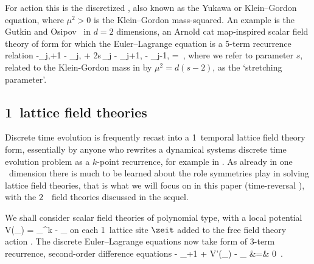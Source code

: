 For action  this is the discretized
{\sPe}, also known as the {Yukawa} or Klein–Gordon
equation, where  ${\mu}^2>0$ is the Klein–\-Gordon mass-squared.
An example is the Gutkin and Osipov \catlatt\ in  $d=2$
dimensions, an Arnold cat map-inspired scalar field theory  of
form  for which the Euler–\-Lagrange
equation  is a 5-term recurrence relation
\beq
      -\ssp_{j,\zeit+1} - \ssp_{j,}
+ 2{s}\,\ssp_{j\zeit}
     - \ssp_{j+1,\zeit} - \ssp_{j-1, \zeit}
     =  
\,,
where we refer to parameter ${s}$, related to the Klein-Gordon mass in
 by ${\mu}^2=d({s}-2)$, as the `stretching
parameter'.

\subsection{1\dmn\ lattice field theories}
\label{s:LC21FT1d}

Discrete time evolution is frequently recast into a 1\dmn\ temporal
lattice field theory form, essentially by anyone who rewrites a
dynamical systems discrete time evolution problem as a $k$-point recurrence,
for example in
.
As already in one \spt\ dimension there is much to be learned about the
role symmetries play in solving lattice field theories, that is what we
will focus on in this paper (time-reversal
), with the $2$\dmn\ \spt\ field
theories discussed in the sequel.

We shall consider scalar field theories of polynomial type, with a local
potential%
\beq
V(\ssp_\zeit) = \ssp_{\zeit}^k - \Ssym{\zeit}\ssp_{\zeit}
on each  1\dmn\ lattice site $\zeit$ added to the free field theory
action . The discrete Euler–Lagrange equations
 now take form of 3-term recurrence, second-order
difference equations
\bea
- \ssp_{\zeit+1} + V'(\ssp_{\zeit}) - \ssp_{}
    &=&
0  %
\,.  %
\label{LC21:1dTempFT}%
\eea

